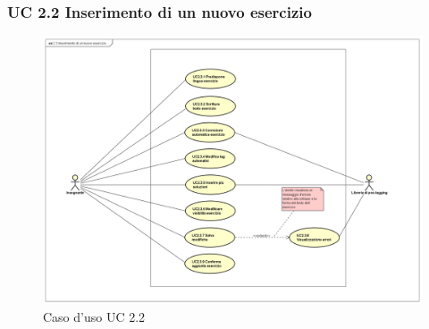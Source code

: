 




\subsubsection{UC 2.2 Inserimento di un nuovo esercizio}

\begin{figure}[H]
	\centering
	\includegraphics[width=18cm]{img/UC22.png} 
	\caption{Caso d'uso UC 2.2}
\end{figure}

